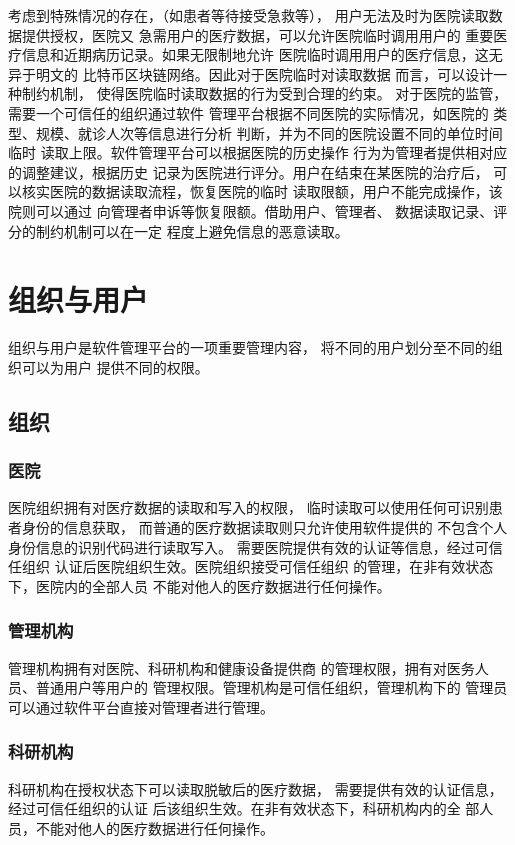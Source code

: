 \documentclass[UTF8]{ctexart}
\begin{document}
    \par
    考虑到特殊情况的存在，（如患者等待接受急救等），
    用户无法及时为医院读取数据提供授权，医院又
    急需用户的医疗数据，可以允许医院临时调用用户的
    重要医疗信息和近期病历记录。如果无限制地允许
    医院临时调用用户的医疗信息，这无异于明文的
    比特币区块链网络。因此对于医院临时对读取数据
    而言，可以设计一种制约机制，
    使得医院临时读取数据的行为受到合理的约束。
    对于医院的监管，需要一个可信任的组织通过软件
    管理平台根据不同医院的实际情况，如医院的
    类型、规模、就诊人次等信息进行分析
    判断，并为不同的医院设置不同的单位时间临时
    读取上限。软件管理平台可以根据医院的历史操作
    行为为管理者提供相对应的调整建议，根据历史
    记录为医院进行评分。用户在结束在某医院的治疗后，
    可以核实医院的数据读取流程，恢复医院的临时
    读取限额，用户不能完成操作，该院则可以通过
    向管理者申诉等恢复限额。借助用户、管理者、
    数据读取记录、评分的制约机制可以在一定
    程度上避免信息的恶意读取。

    \section{组织与用户}
    \par
    组织与用户是软件管理平台的一项重要管理内容，
    将不同的用户划分至不同的组织可以为用户
    提供不同的权限。
    \subsection{组织}
    \subsubsection{医院}
    \par
    医院组织拥有对医疗数据的读取和写入的权限，
    临时读取可以使用任何可识别患者身份的信息获取，
    而普通的医疗数据读取则只允许使用软件提供的
    不包含个人身份信息的识别代码进行读取写入。
    需要医院提供有效的认证等信息，经过可信任组织
    认证后医院组织生效。医院组织接受可信任组织
    的管理，在非有效状态下，医院内的全部人员
    不能对他人的医疗数据进行任何操作。
    \subsubsection{管理机构}
    \par
    管理机构拥有对医院、科研机构和健康设备提供商
    的管理权限，拥有对医务人员、普通用户等用户的
    管理权限。管理机构是可信任组织，管理机构下的
    管理员可以通过软件平台直接对管理者进行管理。
    \subsubsection{科研机构}
    \par
    科研机构在授权状态下可以读取脱敏后的医疗数据，
    需要提供有效的认证信息，经过可信任组织的认证
    后该组织生效。在非有效状态下，科研机构内的全
    部人员，不能对他人的医疗数据进行任何操作。
\end{document}
